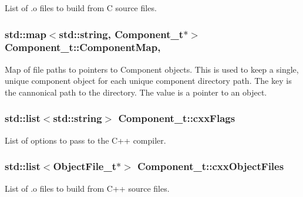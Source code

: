 List of .o files to build from C source files. 

\subsubsection[{\texorpdfstring{Component\+Map}{ComponentMap}}]{\setlength{\rightskip}{0pt plus 5cm}std\+::map$<$std\+::string, {\bf Component\+\_\+t}$\ast$$>$ Component\+\_\+t\+::\+Component\+Map\hspace{0.3cm}{\ttfamily [static]}, {\ttfamily [protected]}}\hypertarget{struct_component__t_acb42341b2a841e8d0697a6c0ac44271d}{}\label{struct_component__t_acb42341b2a841e8d0697a6c0ac44271d}
Map of file paths to pointers to Component objects. This is used to keep a single, unique component object for each unique component directory path. The key is the cannonical path to the directory. The value is a pointer to an object. 
\subsubsection[{\texorpdfstring{cxx\+Flags}{cxxFlags}}]{\setlength{\rightskip}{0pt plus 5cm}std\+::list$<$std\+::string$>$ Component\+\_\+t\+::cxx\+Flags}\hypertarget{struct_component__t_aa9e6663dc71605bbd07a8bc0c2ad3ddf}{}\label{struct_component__t_aa9e6663dc71605bbd07a8bc0c2ad3ddf}


List of options to pass to the C++ compiler. 

\subsubsection[{\texorpdfstring{cxx\+Object\+Files}{cxxObjectFiles}}]{\setlength{\rightskip}{0pt plus 5cm}std\+::list$<${\bf Object\+File\+\_\+t}$\ast$$>$ Component\+\_\+t\+::cxx\+Object\+Files}\hypertarget{struct_component__t_a7c448151842098af219545254b0ad36b}{}\label{struct_component__t_a7c448151842098af219545254b0ad36b}


List of .o files to build from C++ source files. 

